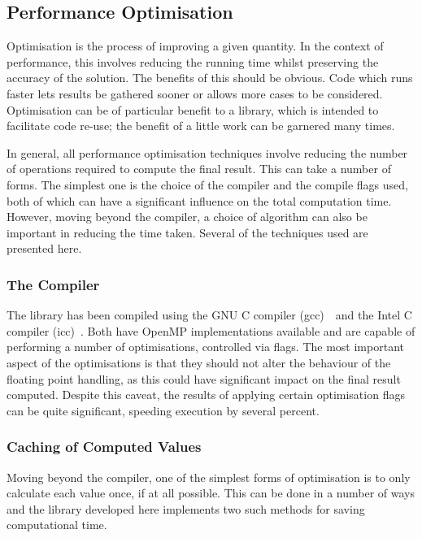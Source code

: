 \subsection{Performance Optimisation}

Optimisation is the process of improving a given quantity.
In the context of performance, this involves reducing the running time whilst
preserving the accuracy of the solution.
The benefits of this should be obvious.
Code which runs faster lets results be gathered sooner or allows more cases to
be considered.
Optimisation can be of particular benefit to a library, which is intended to
facilitate code re-use; the benefit of a little work can be garnered many
times.

In general, all performance optimisation techniques involve reducing the number
of operations required to compute the final result.
This can take a number of forms.
The simplest one is the choice of the compiler and the compile flags used, both
of which can have a significant influence on the total computation time.
However, moving beyond the compiler, a choice of algorithm can also be important
in reducing the time taken.
Several of the techniques used are presented here.

\subsubsection{The Compiler}

The library has been compiled using the GNU C compiler (gcc)~\cite{gcc}\ and the
Intel C compiler (icc)~\cite{icc}.
Both have OpenMP implementations available and are capable of
performing a number of optimisations, controlled via flags.
The most important aspect of the optimisations is that they should not alter the
behaviour of the floating point handling, as this could have significant impact
on the final result computed.
Despite this caveat, the results of applying certain optimisation flags can be
quite significant, speeding execution by several percent.

\subsubsection{Caching of Computed Values}

Moving beyond the compiler, one of the simplest forms of optimisation is to only
calculate each value once, if at all possible.  This can be done in a number of
ways and the library developed here implements two such methods for saving
computational time.

